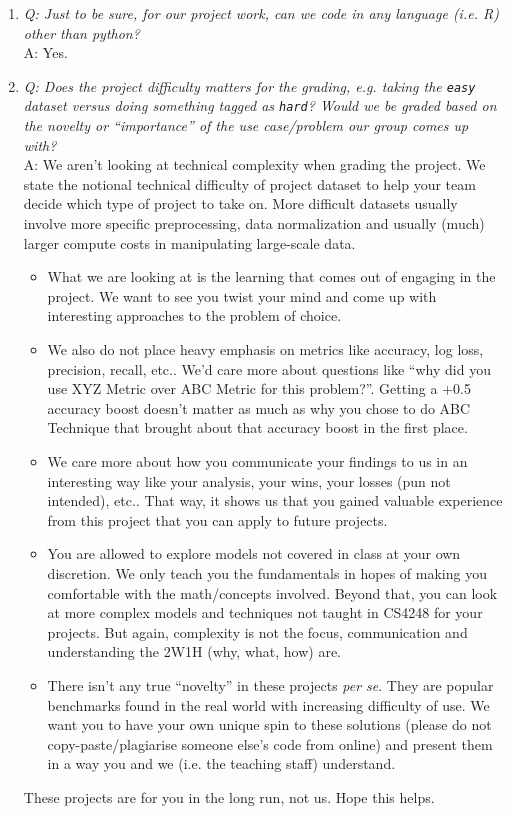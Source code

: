 \documentclass[11pt]{article}
\begin{document}
\begin{enumerate}
    \item {\it Q: Just to be sure, for our project work, can we code in any language (i.e. R) other than python? } \\
    A: Yes. 
    
    \item {\it Q: Does the project difficulty matters for the grading, e.g. taking the {\tt easy} dataset versus doing something tagged as {\tt hard}?  Would we be graded based on the novelty or ``importance'' of the use case/problem our group comes up with?} \\ 
    A: We aren't looking at technical complexity when grading the project. We state the notional technical difficulty of project dataset to help your team decide which type of project to take on.  More difficult datasets usually involve more specific  preprocessing, data normalization and usually (much) larger compute costs in manipulating large-scale data.
    \begin{itemize}
        \item What we are looking at is the learning that comes out of engaging in the project. We want to see you twist your mind and come up with interesting approaches to the problem of choice.
        \item We also do not place heavy emphasis on metrics like accuracy, log loss, precision, recall, etc.. We'd care more about questions like ``why did you use XYZ Metric over ABC Metric for this problem?''. Getting a +0.5 accuracy boost doesn't matter as much as why you chose to do ABC Technique that brought about that accuracy boost in the first place.  \item We care more about how you communicate your findings to us in an interesting way like your analysis, your wins, your losses (pun not intended), etc.. That way, it shows us that you gained valuable experience from this project that you can apply to future projects.
        \item You are allowed to explore models not covered in class at your own discretion. We only teach you the fundamentals in hopes of making you comfortable with the math/concepts involved. Beyond that, you can look at more complex models and techniques not taught in CS4248 for your projects. But again, complexity is not the focus, communication and understanding the 2W1H (why, what, how) are.
        \item There isn't any true ``novelty'' in these projects {\it per se}. They are popular benchmarks found in the real world with increasing difficulty of use. We want you to have your own unique spin to these solutions (please do not copy-paste/plagiarise someone else's code from online) and present them in a way you and we (i.e. the teaching staff) understand.  
    \end{itemize}
    These projects are for you in the long run, not us. Hope this helps.


\end{enumerate}
\end{document}
